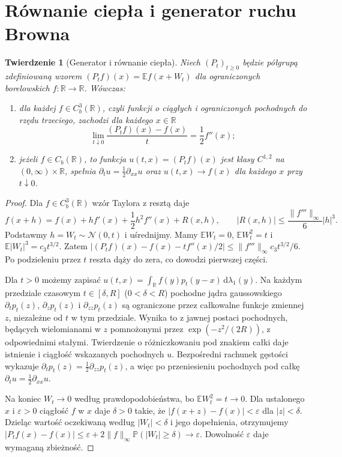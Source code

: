 \documentclass[11pt,a4paper,oneside]{report}
\numberwithin{equation}{chapter}
\theoremstyle{plain}
\newtheorem{twierdzenie}{Twierdzenie}[chapter]
\theoremstyle{definition}
\theoremstyle{remark}
\newcommand{\R}{\mathbb{R}}
\newcommand{\Prob}{\mathbb{P}}
\newcommand{\E}{\mathbb{E}}
\newcommand{\dd}{\mathrm{d}}
\newcommand{\norm}[1]{\lVert #1\rVert}
\newcommand{\Normal}{\mathcal{N}}
\begin{document}
\section{Równanie ciepła i generator ruchu Browna}
\begin{twierdzenie}[Generator i równanie ciepła]
Niech $(P_t)_{t\ge0}$ będzie półgrupą zdefiniowaną wzorem
$(P_tf)(x)=\E f(x+W_t)$ dla ograniczonych borelowskich
$f:\R\to\R$. Wówczas:
\begin{enumerate}
\item dla każdej $f\in C_b^3(\R)$, czyli funkcji o
ciągłych i ograniczonych pochodnych do rzędu trzeciego,
zachodzi dla każdego $x\in\R$
\[
\lim_{t\downarrow0}\frac{(P_tf)(x)-f(x)}{t}
=\frac12 f''(x);
\]
\item jeżeli $f\in C_b(\R)$, to funkcja
$u(t,x)=(P_tf)(x)$ jest klasy $C^{1,2}$ na
$(0,\infty)\times\R$, spełnia
$\partial_tu=\frac12\partial_{xx}u$
oraz $u(t,x)\to f(x)$ dla każdego $x$ przy $t\downarrow0$.
\end{enumerate}
\end{twierdzenie}
\begin{proof}
Dla $f\in C_b^3(\R)$ wzór Taylora z resztą daje
\[
f(x+h)=f(x)+hf'(x)+\frac12h^2f''(x)+R(x,h),\qquad
|R(x,h)|\le\frac{\norm{f'''}_\infty}{6}|h|^3.
\]
Podstawmy $h=W_t\sim\Normal(0,t)$ i uśrednijmy.
Mamy $\E W_t=0$, $\E W_t^2=t$ i
$\E|W_t|^3=c_3t^{3/2}$. Zatem
$|(P_tf)(x)-f(x)-tf''(x)/2|
\le \norm{f'''}_\infty c_3t^{3/2}/6$.
Po podzieleniu przez $t$ reszta dąży do zera,
co dowodzi pierwszej części.

Dla $t>0$ możemy zapisać
$u(t,x)=\int_\R f(y)p_t(y-x)\,\dd\lambda_1(y)$.
Na każdym przedziale czasowym $t\in[\delta,R]$
($0<\delta<R$) pochodne jądra gaussowskiego
$\partial_t p_t(z)$, $\partial_zp_t(z)$ i
$\partial_{zz}p_t(z)$ są ograniczone przez całkowalne
funkcje zmiennej $z$, niezależne od $t$ w tym przedziale.
Wynika to z jawnej postaci pochodnych, będących
wielomianami w $z$ pomnożonymi przez
$\exp(-z^2/(2R))$, z odpowiednimi stałymi.
Twierdzenie o różniczkowaniu pod znakiem całki daje
istnienie i ciągłość wskazanych pochodnych $u$.
Bezpośredni rachunek gęstości wykazuje
$\partial_t p_t(z)=\frac12\partial_{zz}p_t(z)$,
a więc po przeniesieniu pochodnych pod całkę
$\partial_tu=\frac12\partial_{xx}u$.

Na koniec $W_t\to0$ według prawdopodobieństwa,
bo $\E W_t^2=t\to0$. Dla ustalonego $x$ i
$\varepsilon>0$ ciągłość $f$ w $x$ daje $\delta>0$
takie, że $|f(x+z)-f(x)|<\varepsilon$ dla $|z|<\delta$.
Dzieląc wartość oczekiwaną według $|W_t|<\delta$
i jego dopełnienia, otrzymujemy
$|P_tf(x)-f(x)|\le\varepsilon
+2\norm f_\infty\Prob(|W_t|\ge\delta)\to\varepsilon$.
Dowolność $\varepsilon$ daje wymaganą zbieżność.
\end{proof}
\end{document}
